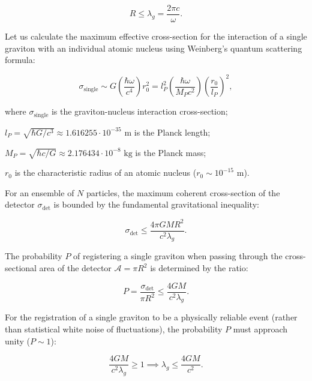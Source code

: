 \begin{equation}\label{eq:1.19}\tag{1.19}
R \le \lambda_g = \frac{2\pi c}{\omega}.
\end{equation}

Let us calculate the maximum effective cross-section for the interaction of a single graviton with an individual atomic nucleus using Weinberg's quantum scattering formula:

\begin{equation}\label{eq:1.20}\tag{1.20}
\sigma_{\text{single}} \sim G \left( \frac{\hbar \omega}{c^4} \right) r_0^2 = l_P^2 \left( \frac{\hbar\omega}{M_P c^2} \right) \left( \frac{r_0}{l_P} \right)^2,
\end{equation}

where $\sigma_{\text{single}}$ is the graviton-nucleus interaction cross-section;  

$l_P = \sqrt{\hbar G / c^3} \approx 1.616255 \cdot 10^{-35}\text{ m}$ is the Planck length;  

$M_P = \sqrt{\hbar c / G} \approx 2.176434 \cdot 10^{-8}\text{ kg}$ is the Planck mass;  

$r_0$ is the characteristic radius of an atomic nucleus ($r_0 \sim 10^{-15}\text{ m}$).

For an ensemble of $N$ particles, the maximum coherent cross-section of the detector $\sigma_{\text{det}}$ is bounded by the fundamental gravitational inequality:

\begin{equation}\label{eq:1.21}\tag{1.21}
\sigma_{\text{det}} \le \frac{4\pi G M R^2}{c^2 \lambda_g}.
\end{equation}

The probability $P$ of registering a single graviton when passing through the cross-sectional area of the detector $\mathcal{A} = \pi R^2$ is determined by the ratio:

\begin{equation}\label{eq:1.22}\tag{1.22}
P = \frac{\sigma_{\text{det}}}{\pi R^2} \le \frac{4 G M}{c^2 \lambda_g}.
\end{equation}

For the registration of a single graviton to be a physically reliable event (rather than statistical white noise of fluctuations), the probability $P$ must approach unity ($P \sim 1$):

\begin{equation}\label{eq:1.23}\tag{1.23}
\frac{4 G M}{c^2 \lambda_g} \ge 1 \implies \lambda_g \le \frac{4 G M}{c^2}.
\end{equation}

